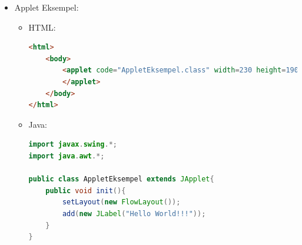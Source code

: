\documentclass{article}
\begin{document}
\begin{itemize}
\begin{itemize}
\begin{itemize}
		\end{itemize}
	\end{itemize}
	\item Applet Eksempel:
	\begin{itemize}
		\item HTML: 
\begin{lstlisting}[language=html]
<html>
	<body>
		<applet code="AppletEksempel.class" width=230 height=190>
		</applet>
	</body>
</html>
\end{lstlisting}
		\item Java:
\begin{lstlisting}[language=java]
import javax.swing.*;
import java.awt.*;

public class AppletEksempel extends JApplet{
	public void init(){
		setLayout(new FlowLayout());
		add(new JLabel("Hello World!!!"));
	}	
}
\end{lstlisting}
	\end{itemize}
\end{itemize}
\end{document}

